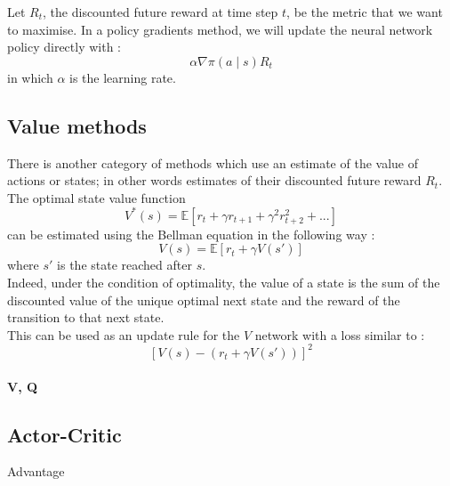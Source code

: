 Let $R_t$, the discounted future reward at time step $t$, be the metric
that we want to maximise. In a policy gradients method, we will update the
neural network policy directly with :
$$\alpha \nabla \pi(a \mid s) R_t$$
in which $\alpha$ is the learning rate.

\subsection{Value methods}
There is another category of methods which use an estimate of the value of
actions or states; in other words estimates of their discounted future reward
$R_t$.\\

The optimal state value function 
$$ V^*(s) = \mathbb{E}\left[ r_t + \gamma r_{t+1} + \gamma^2 r_{t+2}^2 + ...  \right]$$
can be estimated using the Bellman equation in the following way :
$$ V(s) = \mathbb{E}\left[ r_t + \gamma V(s')\right]$$
where $s'$ is the state reached after $s$.\\

Indeed, under the condition of optimality, the value of a state is the sum of
the discounted value of the unique optimal next state and the reward of the 
transition to that next state.\\

This can be used as an update rule for the $V$ network with a loss similar to :
$$ \left[V(s) -  \left(r_t + \gamma V(s') \right)\right]^2 $$

\paragraph{V, Q}

\subsection{Actor-Critic}



Advantage

